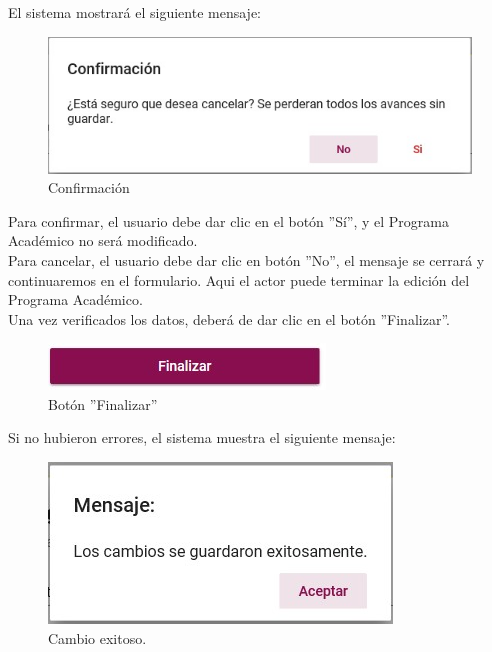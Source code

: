         El sistema mostrará el siguiente mensaje:
        \begin{figure}[H]
            \centering
            \hypertarget{confirmar}{\includegraphics[width=0.7\linewidth]{images/SP3/Confirmacion}}
            \caption{Confirmación}
            \label{confirmar}
        \end{figure}

        Para confirmar, el usuario debe dar clic en el botón ''Sí'', y el Programa Académico no será modificado.\\

        Para cancelar, el usuario debe dar clic en botón ''No'', el mensaje se cerrará y continuaremos en el formulario. Aqui el actor puede terminar la edición del Programa Académico.\\

        Una vez verificados los datos, deberá de dar clic en el botón ''Finalizar''.
        \begin{figure}[H]
        	\centering
        	\hypertarget{btnfin}{\includegraphics[width=0.7\linewidth]{images/SP3/BtnFinalizar}}
        	\caption{Botón ''Finalizar''}
        	\label{btnfin}
        \end{figure}

        Si no hubieron errores, el sistema muestra el siguiente mensaje:

        \begin{figure}[H]
            \centering
            \hypertarget{cambio}{\includegraphics[width=0.7\linewidth]{images/SP3/Cambio}}
            \caption{Cambio exitoso.}
            \label{cambio}
        \end{figure}

